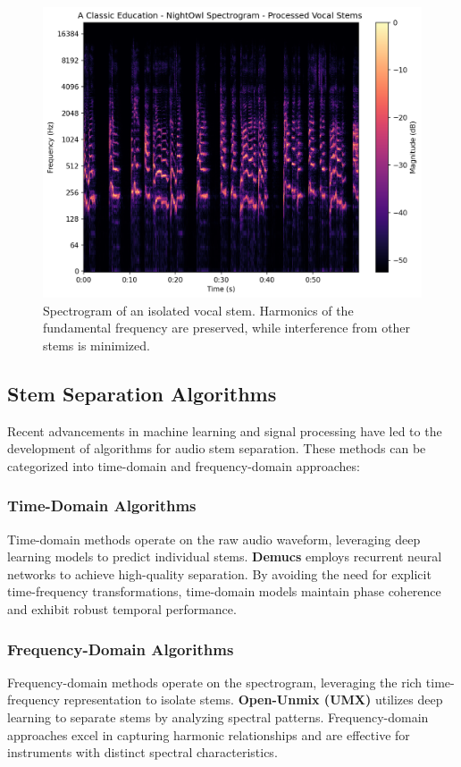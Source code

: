 \documentclass[10pt,twocolumn]{article}
\begin{document}
\begin{figure}[h]
    \centering
    \includegraphics[width=0.95\linewidth]{results graph/vocal.png}
    \caption{Spectrogram of an isolated vocal stem. Harmonics of the fundamental frequency are preserved, while interference from other stems is minimized.}
    \label{fig:spectrogram_stem}
\end{figure}

\subsection{Stem Separation Algorithms}

Recent advancements in machine learning and signal processing have led to the development of algorithms for audio stem separation. These methods can be categorized into time-domain and frequency-domain approaches:

\subsubsection{Time-Domain Algorithms}
Time-domain methods operate on the raw audio waveform, leveraging deep learning models to predict individual stems. \textbf{Demucs} employs recurrent neural networks to achieve high-quality separation. By avoiding the need for explicit time-frequency transformations, time-domain models maintain phase coherence and exhibit robust temporal performance.

\subsubsection{Frequency-Domain Algorithms}
Frequency-domain methods operate on the spectrogram, leveraging the rich time-frequency representation to isolate stems. \textbf{Open-Unmix (UMX)} utilizes deep learning to separate stems by analyzing spectral patterns. Frequency-domain approaches excel in capturing harmonic relationships and are effective for instruments with distinct spectral characteristics.
\end{document}
